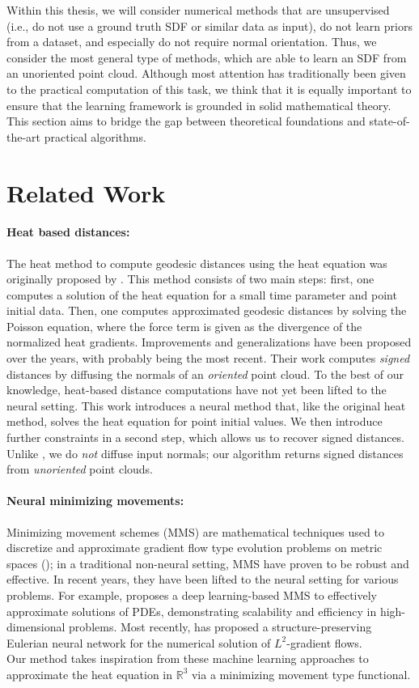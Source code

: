 \documentclass[draft,12pt,openany]{book}
\newcommand{\R}{\mathbb{R}}
\theoremstyle{plainnormal}
\theoremstyle{remark}
\begin{document}
Within this thesis, we will consider numerical methods that are unsupervised (i.e., do not use a ground truth SDF or similar data as input), do not learn priors from a dataset, and especially do not require normal orientation. Thus, we consider the most general type of methods, which are able to learn an SDF from an unoriented point cloud. Although most attention has traditionally been given to the practical computation of this task, we think that it is equally important to ensure that the learning framework is grounded in solid mathematical theory. \\
This section aims to bridge the gap between theoretical foundations and state-of-the-art practical algorithms.

\section{Related Work} \label{SDF_rel_work}
\paragraph{Heat based distances:}
The heat method to compute geodesic distances using the heat equation was originally proposed by \cite{Crane_2013, Crane:2017:HMD}. This method consists of two main steps: first, one computes a solution of the heat equation for a small time parameter and point initial data. Then, one computes approximated geodesic distances by solving the Poisson equation, where the force term is given as the divergence of the normalized heat gradients. Improvements and generalizations have been proposed over the years, with \cite{FengCrane} probably being the most recent. Their work computes \emph{signed} distances by diffusing the normals of an \emph{oriented} point cloud. To the best of our knowledge, heat-based distance computations have not yet been lifted to the neural setting. This work introduces a neural method that, like the original heat method, solves the heat equation for point initial values. We then introduce further constraints in a second step, which allows us to recover signed distances. Unlike \cite{FengCrane}, we do \emph{not} diffuse input normals; our algorithm returns signed distances from \emph{unoriented} point clouds.
\paragraph{Neural minimizing movements:}
Minimizing movement schemes (MMS) are mathematical techniques used to discretize and approximate gradient flow type evolution problems on metric spaces (\cite{de1993new}); in a traditional non-neural setting, MMS have proven to be robust and effective. In recent years, they have been lifted to the neural setting for various problems. For example, \cite{park2023deep} proposes a deep learning-based MMS to effectively approximate solutions of PDEs, demonstrating scalability and efficiency in high-dimensional problems. Most recently, \cite{hu2024energetic} has proposed a structure-preserving Eulerian neural network for the numerical solution of $L^2$-gradient flows.\\
Our method takes inspiration from these machine learning approaches to approximate the heat equation in $\R^3$ via a minimizing movement type functional.
\end{document}
